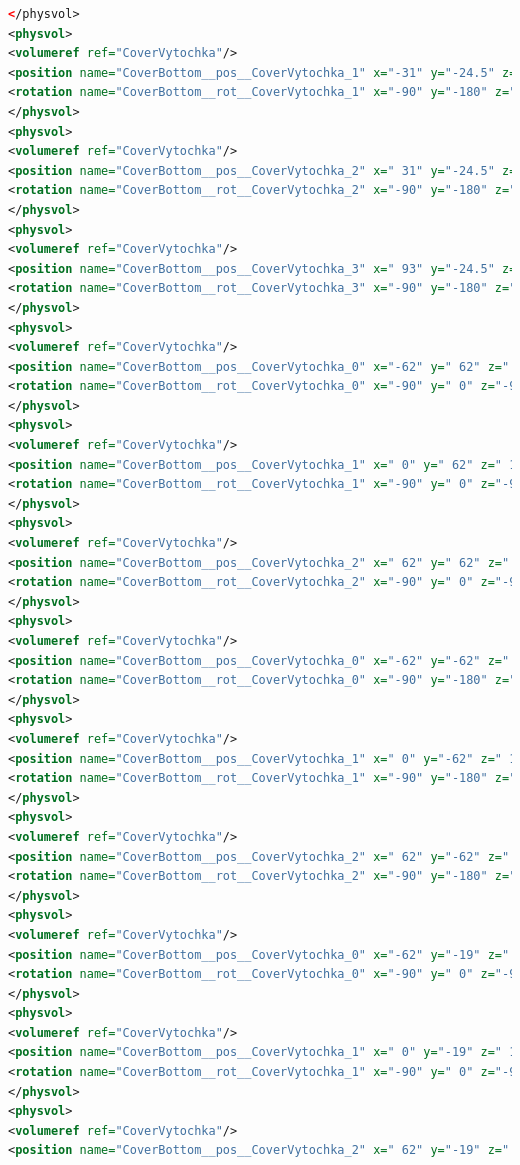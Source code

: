 \begin{lstlisting}[language=XML, firstline=1, lastline=89]
</physvol>
<physvol>
<volumeref ref="CoverVytochka"/>
<position name="CoverBottom__pos__CoverVytochka_1" x="-31" y="-24.5" z=" 1" unit="mm"/>
<rotation name="CoverBottom__rot__CoverVytochka_1" x="-90" y="-180" z="-90" unit="deg"/>
</physvol>
<physvol>
<volumeref ref="CoverVytochka"/>
<position name="CoverBottom__pos__CoverVytochka_2" x=" 31" y="-24.5" z=" 1" unit="mm"/>
<rotation name="CoverBottom__rot__CoverVytochka_2" x="-90" y="-180" z="-90" unit="deg"/>
</physvol>
<physvol>
<volumeref ref="CoverVytochka"/>
<position name="CoverBottom__pos__CoverVytochka_3" x=" 93" y="-24.5" z=" 1" unit="mm"/>
<rotation name="CoverBottom__rot__CoverVytochka_3" x="-90" y="-180" z="-90" unit="deg"/>
</physvol>
<physvol>
<volumeref ref="CoverVytochka"/>
<position name="CoverBottom__pos__CoverVytochka_0" x="-62" y=" 62" z=" 1" unit="mm"/>
<rotation name="CoverBottom__rot__CoverVytochka_0" x="-90" y=" 0" z="-90" unit="deg"/>
</physvol>
<physvol>
<volumeref ref="CoverVytochka"/>
<position name="CoverBottom__pos__CoverVytochka_1" x=" 0" y=" 62" z=" 1" unit="mm"/>
<rotation name="CoverBottom__rot__CoverVytochka_1" x="-90" y=" 0" z="-90" unit="deg"/>
</physvol>
<physvol>
<volumeref ref="CoverVytochka"/>
<position name="CoverBottom__pos__CoverVytochka_2" x=" 62" y=" 62" z=" 1" unit="mm"/>
<rotation name="CoverBottom__rot__CoverVytochka_2" x="-90" y=" 0" z="-90" unit="deg"/>
</physvol>
<physvol>
<volumeref ref="CoverVytochka"/>
<position name="CoverBottom__pos__CoverVytochka_0" x="-62" y="-62" z=" 1" unit="mm"/>
<rotation name="CoverBottom__rot__CoverVytochka_0" x="-90" y="-180" z="-90" unit="deg"/>
</physvol>
<physvol>
<volumeref ref="CoverVytochka"/>
<position name="CoverBottom__pos__CoverVytochka_1" x=" 0" y="-62" z=" 1" unit="mm"/>
<rotation name="CoverBottom__rot__CoverVytochka_1" x="-90" y="-180" z="-90" unit="deg"/>
</physvol>
<physvol>
<volumeref ref="CoverVytochka"/>
<position name="CoverBottom__pos__CoverVytochka_2" x=" 62" y="-62" z=" 1" unit="mm"/>
<rotation name="CoverBottom__rot__CoverVytochka_2" x="-90" y="-180" z="-90" unit="deg"/>
</physvol>
<physvol>
<volumeref ref="CoverVytochka"/>
<position name="CoverBottom__pos__CoverVytochka_0" x="-62" y="-19" z=" 1" unit="mm"/>
<rotation name="CoverBottom__rot__CoverVytochka_0" x="-90" y=" 0" z="-90" unit="deg"/>
</physvol>
<physvol>
<volumeref ref="CoverVytochka"/>
<position name="CoverBottom__pos__CoverVytochka_1" x=" 0" y="-19" z=" 1" unit="mm"/>
<rotation name="CoverBottom__rot__CoverVytochka_1" x="-90" y=" 0" z="-90" unit="deg"/>
</physvol>
<physvol>
<volumeref ref="CoverVytochka"/>
<position name="CoverBottom__pos__CoverVytochka_2" x=" 62" y="-19" z=" 1" unit="mm"/>

\end{lstlisting}
